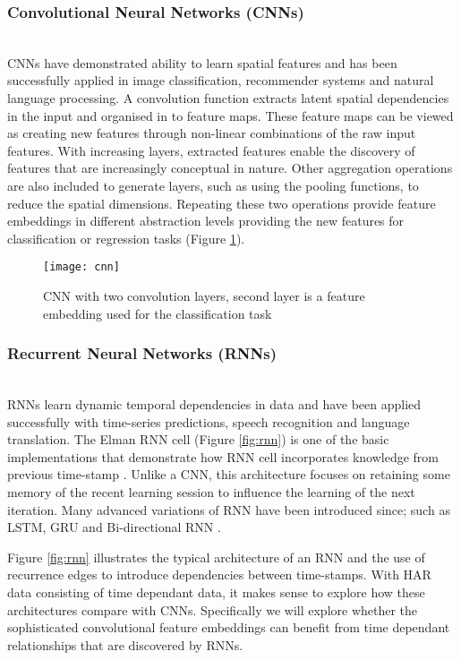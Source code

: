 \subsubsection{Convolutional Neural Networks (CNNs)}\mbox{}\\
CNNs have demonstrated ability to learn spatial features and has been successfully applied in image classification, recommender systems and natural language processing. A convolution function extracts latent spatial dependencies in the input and organised in to feature maps. These feature maps can be viewed as creating new features through non-linear combinations of the raw input features. With increasing layers, extracted features enable the discovery of features that are increasingly conceptual in nature. 
Other aggregation operations are also included to generate layers, such as using the pooling functions, to reduce the spatial dimensions. Repeating these two operations provide feature embeddings in different abstraction levels providing the new features for classification or regression tasks (Figure \ref{fig:cnn}). 

\begin{figure}[ht]
\centering
\texttt{[image: cnn]}
\caption{CNN with two convolution layers, second layer is a feature embedding used for the classification task}
\label{fig:cnn}
\end{figure}

\subsubsection{Recurrent Neural Networks (RNNs)} \mbox{}\\
RNNs learn dynamic temporal dependencies in data and have been applied successfully with time-series predictions, speech recognition and language translation. The Elman RNN cell (Figure \ref{fig:rnn}) is one of the basic implementations that demonstrate how RNN cell incorporates knowledge from previous time-stamp \cite{elman1990finding}. Unlike a CNN, this architecture focuses on retaining some memory of the recent learning session to influence the learning of the next iteration. Many advanced variations of RNN have been introduced since; such as LSTM, GRU and Bi-directional RNN \cite{chung2014empirical,schuster1997bidirectional}. 

Figure \ref{fig:rnn} illustrates the typical architecture of an RNN and the use of recurrence edges to introduce dependencies between time-stamps. With HAR data consisting of time dependant data, it makes sense to explore how these architectures compare with CNNs. Specifically we will explore whether the sophisticated convolutional feature embeddings can benefit from time dependant relationships that are discovered by RNNs.

